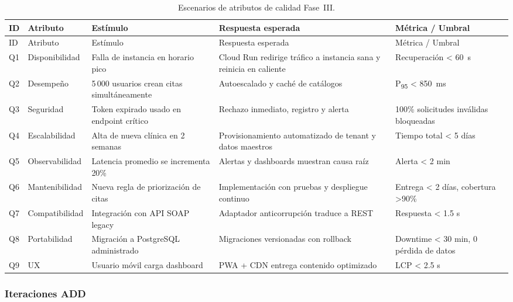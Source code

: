 \documentclass[12pt,a4paper]{article}
\begin{document}
\begin{longtable}{p{0.9cm} p{2.2cm} p{4.2cm} p{4.8cm} p{3.2cm}}
    \caption{Escenarios de atributos de calidad Fase~III.}\label{tab:escenarios-fase3}\\
    \toprule
    ID & Atributo & Estímulo & Respuesta esperada & Métrica / Umbral \\
    \midrule
    \endfirsthead
    \toprule
    ID & Atributo & Estímulo & Respuesta esperada & Métrica / Umbral \\
    \midrule
    \endhead
    Q1 & Disponibilidad & Falla de instancia en horario pico & Cloud Run redirige tráfico a instancia sana y reinicia en caliente & Recuperación < 60~s \\
    Q2 & Desempeño & 5\,000 usuarios crean citas simultáneamente & Autoescalado y caché de catálogos & P\textsubscript{95} < 850~ms \\
    Q3 & Seguridad & Token expirado usado en endpoint crítico & Rechazo inmediato, registro y alerta & 100\% solicitudes inválidas bloqueadas \\
    Q4 & Escalabilidad & Alta de nueva clínica en 2 semanas & Provisionamiento automatizado de tenant y datos maestros & Tiempo total < 5 días \\
    Q5 & Observabilidad & Latencia promedio se incrementa 20\% & Alertas y dashboards muestran causa raíz & Alerta < 2 min \\
    Q6 & Mantenibilidad & Nueva regla de priorización de citas & Implementación con pruebas y despliegue continuo & Entrega < 2 días, cobertura >90\% \\
    Q7 & Compatibilidad & Integración con API SOAP legacy & Adaptador anticorrupción traduce a REST & Respuesta < 1.5 s \\
    Q8 & Portabilidad & Migración a PostgreSQL administrado & Migraciones versionadas con rollback & Downtime < 30 min, 0 pérdida de datos \\
    Q9 & UX & Usuario móvil carga dashboard & PWA + CDN entrega contenido optimizado & LCP < 2.5 s \\
    \bottomrule
\end{longtable}

\subsubsection{Iteraciones ADD}
\end{document}
